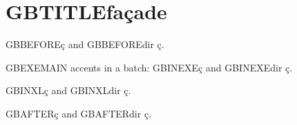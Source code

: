 
\usepackage{hyperref}

\section{GBTITLEfa\c cade}

GBBEFORE\c{c} and GBBEFOREdir ç.

\begin{exe}
\ex GBEXEMAIN accents in a batch: GBINEXE\c{c} and GBINEXEdir ç.
 \begin{xlist}
 \ex GBINXL\c{c} and GBINXLdir ç.
 \end{xlist}
\end{exe}

GBAFTER\c{c} and GBAFTERdir ç.

